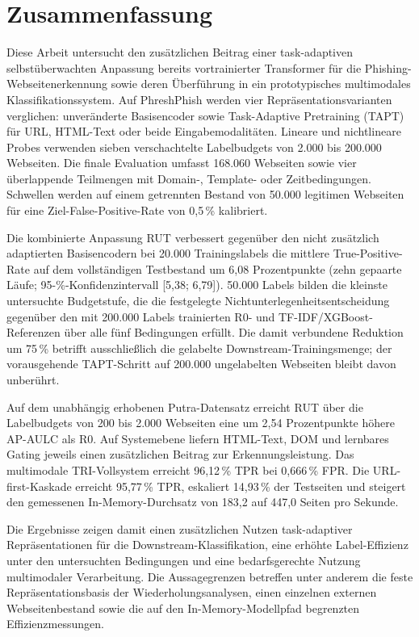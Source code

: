 \clearpage
\chapter*{Zusammenfassung}
Diese Arbeit untersucht den zusätzlichen Beitrag einer task-adaptiven selbstüberwachten
Anpassung bereits vortrainierter Transformer für die Phishing-Webseitenerkennung sowie deren
Überführung in ein prototypisches multimodales Klassifikationssystem. Auf PhreshPhish werden
vier Repräsentationsvarianten verglichen: unveränderte Basisencoder sowie Task-Adaptive
Pretraining (TAPT) für URL, HTML-Text oder beide Eingabemodalitäten. Lineare und
nichtlineare Probes verwenden sieben verschachtelte Labelbudgets von 2.000 bis 200.000
Webseiten. Die finale Evaluation umfasst 168.060 Webseiten sowie vier überlappende
Teilmengen mit Domain-, Template- oder Zeitbedingungen. Schwellen werden auf einem
getrennten Bestand von 50.000 legitimen Webseiten für eine Ziel-False-Positive-Rate von
0,5\,\% kalibriert.

Die kombinierte Anpassung RUT verbessert gegenüber den nicht zusätzlich adaptierten
Basisencodern bei 20.000 Trainingslabels die mittlere True-Positive-Rate auf dem vollständigen
Testbestand um 6,08 Prozentpunkte (zehn gepaarte Läufe; 95-\%-Konfidenzintervall
[5,38; 6,79]). 50.000 Labels bilden die kleinste untersuchte Budgetstufe, die die festgelegte
Nichtunterlegenheitsentscheidung gegenüber den mit 200.000 Labels trainierten R0- und
TF-IDF/XGBoost-Referenzen über alle fünf Bedingungen erfüllt. Die damit verbundene
Reduktion um 75\,\% betrifft ausschließlich die gelabelte Downstream-Trainingsmenge; der
vorausgehende TAPT-Schritt auf 200.000 ungelabelten Webseiten bleibt davon unberührt.

Auf dem unabhängig erhobenen Putra-Datensatz erreicht RUT über die Labelbudgets von 200 bis
2.000 Webseiten eine um 2,54 Prozentpunkte höhere AP-AULC als R0. Auf Systemebene liefern
HTML-Text, DOM und lernbares Gating jeweils einen zusätzlichen Beitrag zur
Erkennungsleistung. Das multimodale TRI-Vollsystem erreicht 96,12\,\% TPR bei
0,666\,\% FPR. Die URL-first-Kaskade erreicht 95,77\,\% TPR, eskaliert 14,93\,\% der
Testseiten und steigert den gemessenen In-Memory-Durchsatz von 183,2 auf 447,0 Seiten pro
Sekunde.

Die Ergebnisse zeigen damit einen zusätzlichen Nutzen task-adaptiver Repräsentationen für die
Downstream-Klassifikation, eine erhöhte Label-Effizienz unter den untersuchten Bedingungen
und eine bedarfsgerechte Nutzung multimodaler Verarbeitung. Die Aussagegrenzen betreffen
unter anderem die feste Repräsentationsbasis der Wiederholungsanalysen, einen einzelnen
externen Webseitenbestand sowie die auf den In-Memory-Modellpfad begrenzten
Effizienzmessungen.

